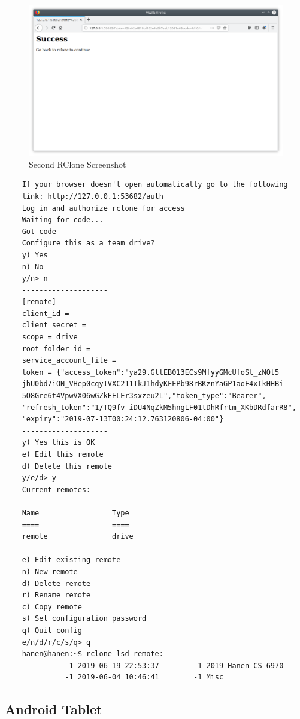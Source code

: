 \begin{figure}[htb]
  \centering
  \includegraphics[scale=0.4]{images/rclone2.png}
  \caption{Second RClone Screenshot}
  \label{fig:rclone2}
\end{figure}

\begin{verbatim}
    If your browser doesn't open automatically go to the following 
    link: http://127.0.0.1:53682/auth
    Log in and authorize rclone for access
    Waiting for code...
    Got code
    Configure this as a team drive?
    y) Yes
    n) No
    y/n> n
    --------------------
    [remote]
    client_id = 
    client_secret = 
    scope = drive
    root_folder_id = 
    service_account_file = 
    token = {"access_token":"ya29.GltEB013ECs9MfyyGMcUfoSt_zNOt5
    jhU0bd7iON_VHep0cqyIVXC211TkJ1hdyKFEPb98rBKznYaGP1aoF4xIkHHBi
    5O8Gre6t4VpwVX06wGZkEELEr3sxzeu2L","token_type":"Bearer",
    "refresh_token":"1/TQ9fv-iDU4NqZkM5hngLF01tDhRfrtm_XKbDRdfarR8",
    "expiry":"2019-07-13T00:24:12.763120806-04:00"}
    --------------------
    y) Yes this is OK
    e) Edit this remote
    d) Delete this remote
    y/e/d> y
    Current remotes:
    
    Name                 Type
    ====                 ====
    remote               drive
    
    e) Edit existing remote
    n) New remote
    d) Delete remote
    r) Rename remote
    c) Copy remote
    s) Set configuration password
    q) Quit config
    e/n/d/r/c/s/q> q
    hanen@hanen:~$ rclone lsd remote:
              -1 2019-06-19 22:53:37        -1 2019-Hanen-CS-6970
              -1 2019-06-04 10:46:41        -1 Misc
\end{verbatim}

\subsection{Android Tablet}
\label{rclonegdrivedemo}


